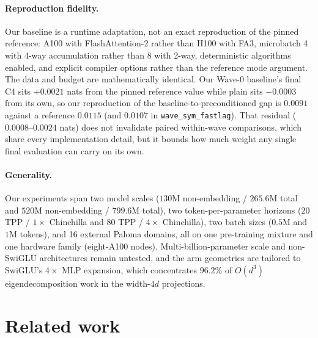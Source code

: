 \paragraph{Reproduction fidelity.}
Our baseline is a runtime adaptation, not an exact reproduction of the pinned
reference: A100 with FlashAttention-2 rather than H100 with FA3, microbatch 4
with 4-way accumulation rather than 8 with 2-way, deterministic algorithms
enabled, and explicit compiler options rather than the reference mode argument.
The data and budget are mathematically identical. Our Wave-0 baseline's final C4
sits $+0.0021$ nats from the pinned reference value while plain  sits
$-0.0003$ from its own, so our reproduction of the baseline-to-preconditioned
gap is $0.0091$ against a reference $0.0115$ (and $0.0107$ in
\texttt{wave\_sym\_fastlag}). That residual ($0.0008$--$0.0024$ nats) does not
invalidate paired within-wave comparisons, which share every implementation
detail, but it bounds how much weight any single final evaluation can carry on
its own.

\paragraph{Generality.}
Our experiments span two model scales ($130\text{M}$ non-embedding /
$265.6\text{M}$ total and $520\text{M}$ non-embedding / $799.6\text{M}$ total),
two token-per-parameter horizons ($20$ TPP / $1\times$ Chinchilla and $80$ TPP
/ $4\times$ Chinchilla), two batch sizes ($0.5\text{M}$ and $1\text{M}$ tokens),
and 16 external Paloma domains, all on one pre-training mixture and one
hardware family (eight-A100 nodes). Multi-billion-parameter scale and non-SwiGLU
architectures remain untested, and the arm geometries are tailored to SwiGLU's
$4\times$ MLP expansion, which concentrates $96.2\%$ of $O(d^3)$
eigendecomposition work in the width-$4d$ projections.

\section{Related work}
\label{sec:related}

